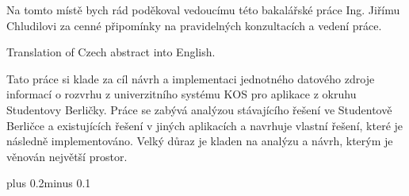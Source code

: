 \documentclass[11pt,twoside,a4paper]{book}
\begin{document}

\coverpagestarts


\acknowledgements
\noindent
Na tomto místě bych rád poděkoval vedoucímu této bakalářské práce Ing. Jiřímu Chludilovi za cenné připomínky na pravidelných konzultacích a vedení práce.





 
\abstractpage

Translation of Czech abstract into English.


\baselineskip

\noindent
Tato práce si klade za cíl návrh a implementaci jednotného datového zdroje informací o rozvrhu z univerzitního systému KOS pro aplikace z okruhu Studentovy Berličky. Práce se zabývá analýzou stávajícího řešení ve Studentově Berličce a existujících řešení v jiných aplikacích a navrhuje vlastní řešení, které je následně implementováno. Velký důraz je kladen na analýzu a návrh, kterým je věnován největší prostor.


\tableofcontents



\listoffigures



\listoftables



\mainbodystarts
\fontsize{11pt}{15pt}\selectfont
{}\baselineskip plus 0.2\baselineskip minus 0.1\baselineskip

\end{document}
